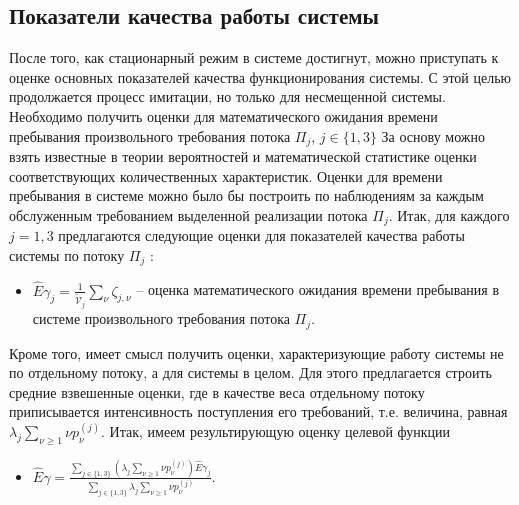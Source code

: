 \documentclass[a4paper,12pt,russian]{extarticle}
\begin{document}
\subsection{Показатели качества работы системы}
После того, как стационарный режим в системе достигнут, можно приступать к оценке основных показателей качества функционирования системы. С этой целью продолжается процесс имитации, но только для несмещенной системы. Необходимо получить оценки для математического ожидания времени пребывания произвольного требования потока $\Pi_j$, $j\in \{1, 3\}$
За основу можно взять известные в теории вероятностей и математической статистике оценки соответствующих количественных характеристик. Оценки для времени пребывания в системе можно было бы построить по наблюдениям за каждым обслуженным требованием выделенной реализации потока $\Pi_j$.
Итак, для каждого $j=1,3$  предлагаются следующие оценки для показателей качества работы системы по потоку $\Pi_j$ :
\begin{itemize}
    \item $\hat{E}\gamma_{j}=\frac{1}{\tilde{\mathcal{V}}_j}\sum_{\nu}\zeta_{j,\nu}$  -- оценка математического ожидания времени пребывания в системе произвольного требования потока $\Pi_j$.
\end{itemize}
Кроме того, имеет смысл получить оценки, характеризующие работу системы не по отдельному потоку, а для системы в целом. Для этого предлагается строить средние взвешенные оценки, где в качестве веса отдельному потоку  приписывается интенсивность поступления его требований, т.е. величина, равная $\lambda_j \sum_{\nu\geqslant1}\nu p_{\nu}^{(j)}$. Итак, имеем результирующую оценку целевой функции
\begin{itemize}
    \item $\hat{E}\gamma=\frac{\sum_{j\in\{1,3\}} (\lambda_j \sum_{\nu\geqslant1}\nu p_{\nu}^{(j)})\hat{E}\gamma_{j} }{\sum_{j\in\{1,3\}} \lambda_j \sum_{\nu\geqslant1}\nu p_{\nu}^{(j)}}$.
\end{itemize}
\end{document}
